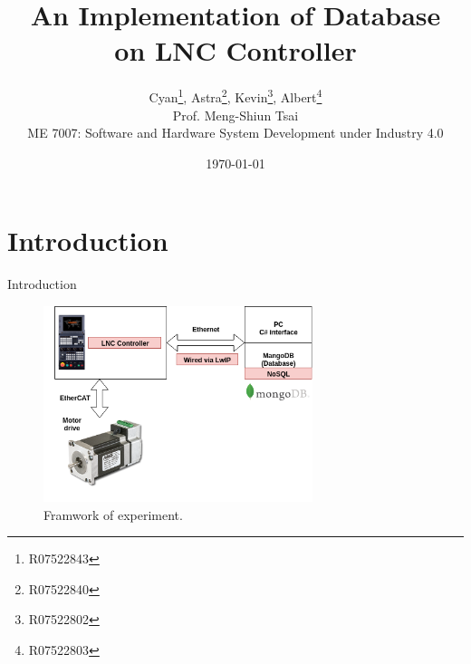 \documentclass[11pt]{beamer}
\title[Final Project]{An Implementation of Database \\ on LNC Controller} %
\author[Software and Hardware System Development under Industry 4.0]{Cyan\footnote{\tiny{R07522843}}, Astra\footnote{\tiny{R07522840}}, Kevin\footnote{\tiny{R07522802}}, Albert\footnote{\tiny{R07522803}}\\
\medskip
\medskip
\small{Prof. Meng-Shiun Tsai}\\
\medskip
\small{ME 7007: Software and Hardware System Development under Industry 4.0}} %
\institute[Robotics Laboratory] %
{
M.E., National Taiwan University  %
}
\date{\today} %
\begin{document}
\begin{frame}[plain]
  \titlepage
\end{frame}

\begin{frame}{\contentsname}
  \begin{multicols}{2}
  \tableofcontents
  \end{multicols}
\end{frame}

\section{Introduction}
\begin{frame}{Introduction}
  \begin{figure}
    \begin{small}
      \begin{center}
        \includegraphics[width=0.7\textwidth]{Untitled.png}
      \end{center}
      \caption{Framwork of experiment.}
      \label{fig:}
    \end{small}
  \end{figure}
  
\end{frame}
\end{document}

